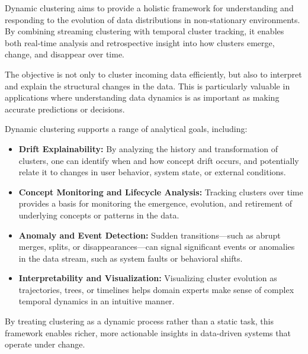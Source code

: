 Dynamic clustering aims to provide a holistic framework for understanding and
responding to the evolution of data distributions in non-stationary
environments. By combining streaming clustering with temporal cluster tracking,
it enables both real-time analysis and retrospective insight into how clusters
emerge, change, and disappear over time.

The objective is not only to cluster incoming data efficiently, but also to
interpret and explain the structural changes in the data. This is particularly
valuable in applications where understanding data dynamics is as important as
making accurate predictions or decisions.

Dynamic clustering supports a range of analytical goals, including:

\begin{itemize}
    \item \textbf{Drift Explainability:} By analyzing the history and transformation of
          clusters, one can identify when and how concept drift occurs, and potentially
          relate it to changes in user behavior, system state, or external conditions.

    \item \textbf{Concept Monitoring and Lifecycle Analysis:} Tracking clusters over time
          provides a basis for monitoring the emergence, evolution, and retirement of
          underlying concepts or patterns in the data.

    \item \textbf{Anomaly and Event Detection:} Sudden transitions—such as abrupt merges,
          splits, or disappearances—can signal significant events or anomalies in the data stream,
          such as system faults or behavioral shifts.

    \item \textbf{Interpretability and Visualization:} Visualizing cluster evolution as
          trajectories, trees, or timelines helps domain experts make sense of complex temporal
          dynamics in an intuitive manner.
\end{itemize}

By treating clustering as a dynamic process rather than a static task, this
framework enables richer, more actionable insights in data-driven systems that
operate under change.